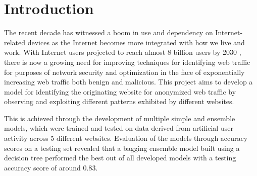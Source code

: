 \documentclass[10pt,sigconf,letterpaper,nonacm]{acmart}
\begin{document}
\title{\PaperTitle}

\author{Charles Hu}

\begin{abstract}
  In this project, we address the task of identifying the originating website given some anonymized web traffic for the purposes of gaining new insights for improving network security and optimization.
  We construct a data set of TCP streams sourced from 5 different websites: github.com, google.com, reuters.com, wikipedia.com, and youtube.com.
  With this, we develop and test 15 different machine learning models based on simple and ensemble model designs.
  We determine that a bagging ensemble model built using a decision tree provides the best performance with an accuracy score of 0.83 on the testing set, and demonstrate the capabilities of ensemble models and note the implication that web traffic data may be distinctive and generally non-overlapping.
  Challenges to this project are then analyzed and addressed with potential future avenues for improvement.
\end{abstract}


\maketitle

\section{Introduction}

The recent decade has witnessed a boom in use and dependency on Internet-related devices as the Internet becomes more integrated with how we live and work.
With Internet users projected to reach almost 8 billion users by 2030 \cite{forbes}, there is now a growing need for improving techniques for identifying web traffic for purposes of network security and optimization \cite{traffic} in the face of exponentially increasing web traffic both benign and malicious.
This project aims to develop a model for identifying the originating website for anonymized web traffic by observing and exploiting different patterns exhibited by different websites.

This is achieved through the development of multiple simple and ensemble models, which were trained and tested on data derived from artificial user activity across 5 different websites.
Evaluation of the models through accuracy scores on a testing set revealed that a bagging ensemble model built using a decision tree performed the best out of all developed models with a testing accuracy score of around 0.83.
\end{document}
